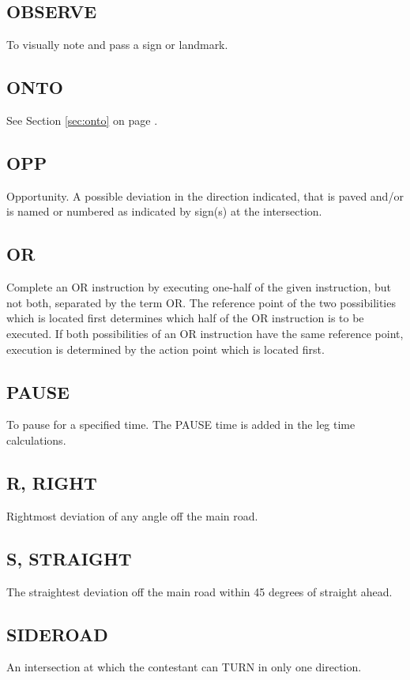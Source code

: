 \subsection{OBSERVE}
To visually note and pass a sign or landmark.

\subsection{ONTO}
See Section \ref{sec:onto} on page \pageref{sec:onto}.

\subsection{OPP}
Opportunity.  A possible deviation in the direction indicated, that is paved and/or is named or numbered as indicated by sign(s) at the intersection.

\subsection{OR}
Complete an OR instruction by executing one-half of the given instruction, but not both, separated by the term OR.  The reference point of the two possibilities which is located first determines which half of the OR instruction is to be executed.  If both possibilities of an OR instruction have the same reference point, execution is determined by the action point which is located first.

\subsection{PAUSE}
To pause for a specified time.  The PAUSE time is added in the leg time calculations.

\subsection{R, RIGHT}
Rightmost deviation of any angle off the main road.

\subsection{S, STRAIGHT}
The straightest deviation off the main road within 45 degrees of straight ahead.

\subsection{SIDEROAD}
An intersection at which the contestant can TURN in only one direction.

